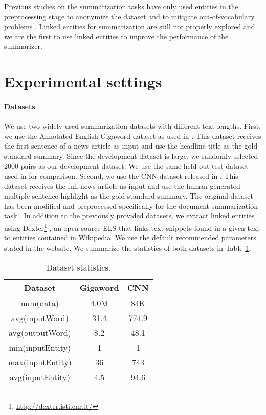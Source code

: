 \documentclass[11pt,a4paper]{article}
\begin{document}
Previous studies on the summarization tasks have only used entities in the preprocessing stage to anonymize the dataset \cite{nallapati2016abstractive} and to mitigate out-of-vocabulary problems \cite{tan2017abstractive}.
Linked entities for summarization are still not properly explored and we are the first to use linked entities to improve the performance of the summarizer.

\section{Experimental settings}
\label{sec:exp}

\paragraph{Datasets}

We use two widely used summarization datasets with different text lengths. First, we use the Annotated English Gigaword dataset as used in \cite{rush2015neural}.
This dataset receives the first sentence of a news article as input and use the headline title as the gold standard summary.
Since the development dataset is large, we randomly selected 2000 pairs as our development dataset. We use the same held-out test dataset used in \cite{rush2015neural} for comparison.
Second, we use the CNN dataset released in \cite{hermann2015teaching}.
This dataset receives the full news article as input and use the human-generated multiple sentence highlight as the gold standard summary.
The original dataset has been modified and preprocessed specifically for the document summarization task \cite{nallapati2016abstractive}.
In addition to the previously provided datasets, we extract linked entities using Dexter\footnote{\url{http://dexter.isti.cnr.it/}} \cite{ceccarelli2013dexter}, an open source ELS that links text snippets found in a given text to entities contained in Wikipedia. 
We use the default recommended parameters stated in the website.
We summarize the statistics of both datasets in Table \ref{tab:statistics}.

\begin{table}[t]
\centering
    \begin{tabular}{|c|cc|}
    \hline
    Dataset & Gigaword & CNN \\
    \hline
    num(data) & 4.0M  & 84K \\
    avg(inputWord) & 31.4  & 774.9 \\
    avg(outputWord) & 8.2   & 48.1 \\
    \hline
    min(inputEntity) & 1     & 1 \\
    max(inputEntity) & 36    & 743 \\
    avg(inputEntity) & 4.5   & 94.6 \\
    \hline
    \end{tabular}\caption{Dataset statistics.}
  \label{tab:statistics}\end{table}
\end{document}
